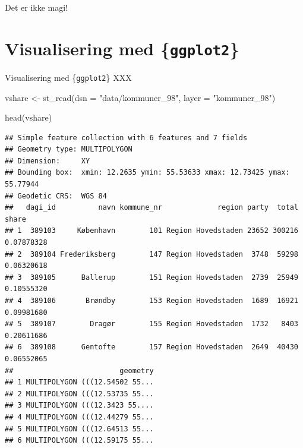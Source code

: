 \documentclass[
  8pt,
  ignorenonframetext,
  aspectratio=169]{beamer}
\newenvironment{Shaded}{}{}
\newcommand{\AttributeTok}[1]{\textcolor[rgb]{0.49,0.56,0.16}{#1}}
\newcommand{\FunctionTok}[1]{\textcolor[rgb]{0.02,0.16,0.49}{#1}}
\newcommand{\NormalTok}[1]{#1}
\newcommand{\OtherTok}[1]{\textcolor[rgb]{0.00,0.44,0.13}{#1}}
\newcommand{\StringTok}[1]{\textcolor[rgb]{0.25,0.44,0.63}{#1}}
\begin{document}
\begin{frame}{Det er ikke magi!}
\protect\hypertarget{det-er-ikke-magi}{}
\end{frame}

\hypertarget{visualisering-med-ggplot2}{%
\section{\texorpdfstring{Visualisering med
\{\texttt{ggplot2}\}}{Visualisering med \{ggplot2\}}}\label{visualisering-med-ggplot2}}

\begin{frame}[fragile]{Visualisering med \{\texttt{ggplot2}\}}
\protect\hypertarget{visualisering-med-ggplot2-1}{}
XXX

\tiny

\begin{Shaded}
\begin{Highlighting}[]
\NormalTok{vshare }\OtherTok{\textless{}{-}} \FunctionTok{st\_read}\NormalTok{(}\AttributeTok{dsn =} \StringTok{"data/kommuner\_98"}\NormalTok{,}
                  \AttributeTok{layer =} \StringTok{"kommuner\_98"}\NormalTok{)}
\end{Highlighting}
\end{Shaded}

\normalsize

\tiny

\begin{Shaded}
\begin{Highlighting}[]
\FunctionTok{head}\NormalTok{(vshare)}
\end{Highlighting}
\end{Shaded}

\begin{verbatim}
## Simple feature collection with 6 features and 7 fields
## Geometry type: MULTIPOLYGON
## Dimension:     XY
## Bounding box:  xmin: 12.2635 ymin: 55.53633 xmax: 12.73425 ymax: 55.77944
## Geodetic CRS:  WGS 84
##   dagi_id          navn kommune_nr             region party  total      share
## 1  389103     København        101 Region Hovedstaden 23652 300216 0.07878328
## 2  389104 Frederiksberg        147 Region Hovedstaden  3748  59298 0.06320618
## 3  389105      Ballerup        151 Region Hovedstaden  2739  25949 0.10555320
## 4  389106       Brøndby        153 Region Hovedstaden  1689  16921 0.09981680
## 5  389107        Dragør        155 Region Hovedstaden  1732   8403 0.20611686
## 6  389108      Gentofte        157 Region Hovedstaden  2649  40430 0.06552065
##                         geometry
## 1 MULTIPOLYGON (((12.54502 55...
## 2 MULTIPOLYGON (((12.53735 55...
## 3 MULTIPOLYGON (((12.3423 55....
## 4 MULTIPOLYGON (((12.44279 55...
## 5 MULTIPOLYGON (((12.64513 55...
## 6 MULTIPOLYGON (((12.59175 55...
\end{verbatim}

\normalsize
\end{frame}
\end{document}
